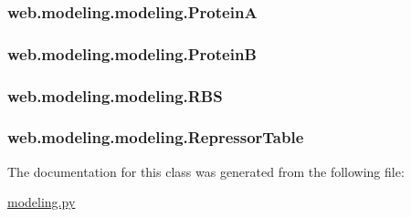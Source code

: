 \hypertarget{classweb_1_1modeling_1_1modeling_a6da71e7f269b891b00412fc6897c9747}{
\subsubsection[{Protein\-A}]{\setlength{\rightskip}{0pt plus 5cm}web.\-modeling.\-modeling.\-Protein\-A}}\label{classweb_1_1modeling_1_1modeling_a6da71e7f269b891b00412fc6897c9747}
\hypertarget{classweb_1_1modeling_1_1modeling_aff3389950cb599a298b6370a2dad0185}{
\subsubsection[{Protein\-B}]{\setlength{\rightskip}{0pt plus 5cm}web.\-modeling.\-modeling.\-Protein\-B}}\label{classweb_1_1modeling_1_1modeling_aff3389950cb599a298b6370a2dad0185}
\hypertarget{classweb_1_1modeling_1_1modeling_a4cc11ff2adba839163240e9ea66ef398}{
\subsubsection[{R\-B\-S}]{\setlength{\rightskip}{0pt plus 5cm}web.\-modeling.\-modeling.\-R\-B\-S}}\label{classweb_1_1modeling_1_1modeling_a4cc11ff2adba839163240e9ea66ef398}
\hypertarget{classweb_1_1modeling_1_1modeling_a0314c62c089feb8e1d85448cc94f7900}{
\subsubsection[{Repressor\-Table}]{\setlength{\rightskip}{0pt plus 5cm}web.\-modeling.\-modeling.\-Repressor\-Table}}\label{classweb_1_1modeling_1_1modeling_a0314c62c089feb8e1d85448cc94f7900}


The documentation for this class was generated from the following file\-:\begin{DoxyCompactItemize}
\item 
\hyperlink{modeling_8py}{modeling.\-py}\end{DoxyCompactItemize}
